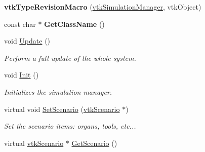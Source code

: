 \begin{DoxyCompactItemize}
\item 
\hypertarget{classvtkSimulationManager_a94057736fabea1165abdf718d60de5e3}{
{\bfseries vtkTypeRevisionMacro} (\hyperlink{classvtkSimulationManager}{vtkSimulationManager}, vtkObject)}
\label{classvtkSimulationManager_a94057736fabea1165abdf718d60de5e3}

\item 
\hypertarget{classvtkSimulationManager_ade7652c3dc0ca2a0c1d80bf2a3a8dc16}{
const char $\ast$ {\bfseries GetClassName} ()}
\label{classvtkSimulationManager_ade7652c3dc0ca2a0c1d80bf2a3a8dc16}

\item 
void \hyperlink{classvtkSimulationManager_a2d78cb22ac71b2e1e1f549c2df509a60}{Update} ()
\begin{DoxyCompactList}\small\item\em Perform a full update of the whole system. \item\end{DoxyCompactList}\item 
\hypertarget{classvtkSimulationManager_a701a5b97305c54f3662d0c931a03b58a}{
void \hyperlink{classvtkSimulationManager_a701a5b97305c54f3662d0c931a03b58a}{Init} ()}
\label{classvtkSimulationManager_a701a5b97305c54f3662d0c931a03b58a}

\begin{DoxyCompactList}\small\item\em Initializes the simulation manager. \item\end{DoxyCompactList}\item 
virtual void \hyperlink{classvtkSimulationManager_a823e52926781301387627efed3d2c592}{SetScenario} (\hyperlink{classvtkScenario}{vtkScenario} $\ast$)
\begin{DoxyCompactList}\small\item\em Set the scenario items: organs, tools, etc... \item\end{DoxyCompactList}\item 
\hypertarget{classvtkSimulationManager_ad2fb3020218cf4745bfb2b37b0d42ee8}{
virtual \hyperlink{classvtkScenario}{vtkScenario} $\ast$ \hyperlink{classvtkSimulationManager_ad2fb3020218cf4745bfb2b37b0d42ee8}{GetScenario} ()}
\label{classvtkSimulationManager_ad2fb3020218cf4745bfb2b37b0d42ee8}


\end{DoxyCompactItemize}
